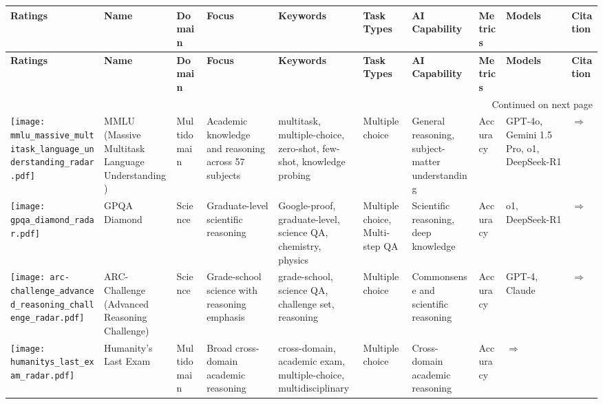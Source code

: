 
\begin{landscape}
{\footnotesize
\begin{longtable}{|p{}|p{}|p{}|p{}|p{}|p{}|p{}|p{}|p{}|p{}|}
\hline
\textbf{Ratings} & \textbf{Name} & \textbf{Domain} & \textbf{Focus} & \textbf{Keywords} & \textbf{Task Types} & \textbf{AI Capability} & \textbf{Metrics} & \textbf{Models} & \textbf{Citation}  \\ \hline
\endfirsthead
\hline
\textbf{Ratings} & \textbf{Name} & \textbf{Domain} & \textbf{Focus} & \textbf{Keywords} & \textbf{Task Types} & \textbf{AI Capability} & \textbf{Metrics} & \textbf{Models} & \textbf{Citation}  \\ \hline
\endhead
\hline
\multicolumn{10}{r}{Continued on next page} \\
\endfoot
\hline
\endlastfoot
\texttt{[image: mmlu\_massive\_multitask\_language\_understanding\_radar.pdf]} & MMLU (Massive Multitask Language Understanding) & Multidomain & Academic knowledge and reasoning across 57 subjects & multitask, multiple-choice, zero-shot, few-shot, knowledge probing & Multiple choice & General reasoning, subject-matter understanding & Accuracy & GPT-4o, Gemini 1.5 Pro, o1, DeepSeek-R1 & \cite{hendrycks2021measuring}\href{https://paperswithcode.com/dataset/mmlu}{$\Rightarrow$} \\ \hline
\texttt{[image: gpqa\_diamond\_radar.pdf]} & GPQA Diamond & Science & Graduate-level scientific reasoning & Google-proof, graduate-level, science QA, chemistry, physics & Multiple choice, Multi-step QA & Scientific reasoning, deep knowledge & Accuracy & o1, DeepSeek-R1 & \cite{rein2023gpqagraduatelevelgoogleproofqa}\href{https://arxiv.org/abs/2311.12022}{$\Rightarrow$} \\ \hline
\texttt{[image: arc-challenge\_advanced\_reasoning\_challenge\_radar.pdf]} & ARC-Challenge (Advanced Reasoning Challenge) & Science & Grade-school science with reasoning emphasis & grade-school, science QA, challenge set, reasoning & Multiple choice & Commonsense and scientific reasoning & Accuracy & GPT-4, Claude & \cite{clark2018think}\href{https://allenai.org/data/arc}{$\Rightarrow$} \\ \hline
\texttt{[image: humanitys\_last\_exam\_radar.pdf]} & Humanity's Last Exam & Multidomain & Broad cross-domain academic reasoning & cross-domain, academic exam, multiple-choice, multidisciplinary & Multiple choice & Cross-domain academic reasoning & Accuracy & \cite{phan2025humanitysexam}\href{https://arxiv.org/abs/2501.14249}{$\Rightarrow$} \\ \hline

\end{longtable}}
\end{landscape}
